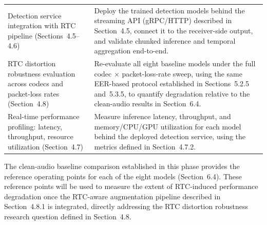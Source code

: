 \begin{longtable}{>{\raggedright\arraybackslash}p{4.2cm} >{\raggedright\arraybackslash}p{8.5cm}}
Detection service integration with RTC pipeline (Sections~4.5--4.6) &
Deploy the trained detection models behind the streaming API (gRPC/HTTP) described in Section~4.5, connect it to the receiver-side output, and validate chunked inference and temporal aggregation end-to-end. \\
RTC distortion robustness evaluation across codecs and packet-loss rates (Section~4.8) &
Re-evaluate all eight baseline models under the full codec $\times$ packet-loss-rate sweep, using the same EER-based protocol established in Sections~5.2.5 and~5.3.5, to quantify degradation relative to the clean-audio results in Section~6.4. \\
Real-time performance profiling: latency, throughput, resource utilization (Section~4.7) &
Measure inference latency, throughput, and memory/CPU/GPU utilization for each model behind the deployed detection service, using the metrics defined in Section~4.7.2. \\
\end{longtable}

The clean-audio baseline comparison established in this phase provides the reference operating points for each of the eight models (Section~6.4). These reference points will be used to measure the extent of RTC-induced performance degradation once the RTC-aware augmentation pipeline described in Section~4.8.1 is integrated, directly addressing the RTC distortion robustness research question defined in Section~4.8.
